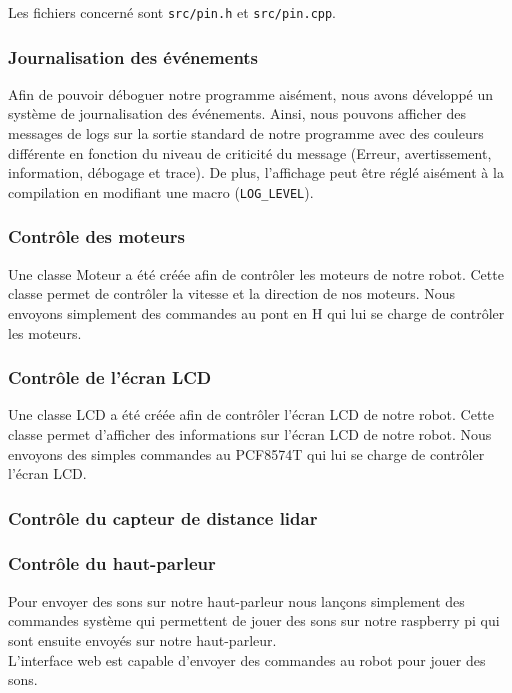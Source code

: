 Les fichiers concerné sont \texttt{src/pin.h} et \texttt{src/pin.cpp}.

\subsubsection{Journalisation des événements}

Afin de pouvoir déboguer notre programme aisément, nous avons développé un système de journalisation des événements.
Ainsi, nous pouvons afficher des messages de logs sur la sortie standard de notre programme avec des couleurs différente en fonction du niveau de criticité du message (Erreur, avertissement, information, débogage et trace).
De plus, l'affichage peut être réglé aisément à la compilation en modifiant une macro (\texttt{LOG\_LEVEL}).

\subsubsection{Contrôle des moteurs}
Une classe Moteur a été créée afin de contrôler les moteurs de notre robot. Cette classe permet de contrôler la vitesse et la direction de nos moteurs.
Nous envoyons simplement des commandes au pont en H qui lui se charge de contrôler les moteurs.

\subsubsection*{Contrôle de l'écran LCD}
Une classe LCD a été créée afin de contrôler l'écran LCD de notre robot. Cette classe permet d'afficher des informations sur l'écran LCD de notre robot.
Nous envoyons des simples commandes au PCF8574T qui lui se charge de contrôler l'écran LCD.

\subsubsection*{Contrôle du capteur de distance lidar}
\lipsum[1-2]
\subsubsection*{Contrôle du haut-parleur}

Pour envoyer des sons sur notre haut-parleur nous lançons simplement des commandes système qui permettent de jouer des sons sur notre raspberry pi qui sont ensuite envoyés sur notre haut-parleur.
\\
L'interface web est capable d'envoyer des commandes au robot pour jouer des sons.

